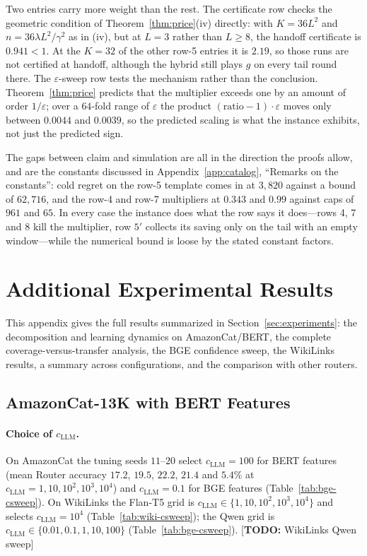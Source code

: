 \documentclass[anon]{alt2027} %
\newcommand{\eps}{\varepsilon}
\newcommand{\todo}[1]{\textcolor{red!70!black}{[\textbf{TODO:} #1]}}
\begin{document}
Two entries carry more weight than the rest. The certificate row checks the
geometric condition of Theorem~\ref{thm:price}(iv) directly: with $K=36L^2$
and $n=36\lambda L^2/\gamma^2$ as in (iv), but at $L=3$ rather than $L\ge8$, the
handoff certificate is $0.941<1$. At the $K=32$ of the other row-5 entries it
is $2.19$, so those runs are not certified at handoff, although the hybrid
still plays $g$ on every tail round there. The $\eps$-sweep row tests the
mechanism rather than the conclusion. Theorem~\ref{thm:price} predicts that
the multiplier exceeds one by an amount of order $1/\eps$; over a $64$-fold
range of $\eps$ the product $(\text{ratio}-1)\cdot\eps$ moves only between
$0.0044$ and $0.0039$, so the predicted scaling is what the instance exhibits,
not just the predicted sign.

The gaps between claim and simulation are all in the direction the proofs
allow, and are the constants discussed in
Appendix~\ref{app:catalog}, ``Remarks on the constants'': cold regret on the
row-5 template comes in at $3{,}820$ against a bound of $62{,}716$, and the
row-4 and row-7 multipliers at $0.343$ and $0.99$ against caps of $961$ and
$65$. In every case the instance does what the row says it does---rows 4, 7
and 8 kill the multiplier, row $5'$ collects its saving only on the tail with
an empty window---while the numerical bound is loose by the stated constant
factors.

\section{Additional Experimental Results}
\label{app:more-exp}

This appendix gives the full results summarized in Section~\ref{sec:experiments}:
the decomposition and learning dynamics on AmazonCat/BERT, the complete
coverage-versus-transfer analysis, the BGE confidence sweep, the WikiLinks
results, a summary across configurations, and the comparison with other
routers.

\subsection{AmazonCat-13K with BERT Features}
\label{app:amazon-bert}

\paragraph{Choice of $c_{\mathrm{LLM}}$.} On AmazonCat the tuning seeds $11$--$20$ select
$c_{\mathrm{LLM}}=100$ for BERT features (mean Router accuracy $17.2$, $19.5$, $22.2$, $21.4$
and $5.4\%$ at $c_{\mathrm{LLM}}=1,10,10^2,10^3,10^4$) and $c_{\mathrm{LLM}}=0.1$ for BGE features
(Table~\ref{tab:bge-csweep}). On WikiLinks the Flan-T5 grid is
$c_{\mathrm{LLM}}\in\{1,10,10^2,10^3,10^4\}$ and selects $c_{\mathrm{LLM}}=10^4$
(Table~\ref{tab:wiki-csweep}); the Qwen grid is
$c_{\mathrm{LLM}}\in\{0.01,0.1,1,10,100\}$ (Table~\ref{tab:bge-csweep}).
\todo{WikiLinks Qwen sweep}
\end{document}
